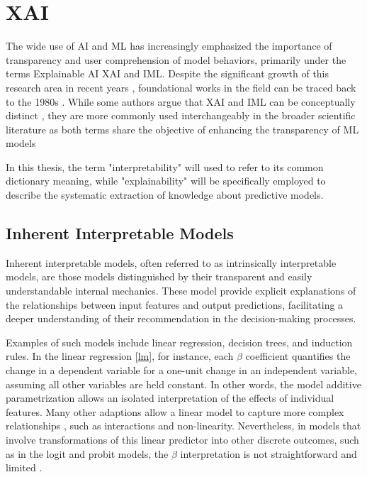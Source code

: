 \section{XAI}

The wide use of \gls{AI} and \gls{ML} has increasingly emphasized the importance of transparency and user comprehension of model behaviors, primarily under the terms Explainable AI \gls{XAI} and \gls{IML}. Despite the significant growth of this research area in recent years \cite{Arya2019OneTechniques}, foundational works in the field can be traced back to the 1980s \cite{Fagant1980COMPUTER-BASEDVM, Bareiss1988Protos:Apprentice}. While some authors argue that \gls{XAI} and \gls{IML} can be conceptually distinct \cite{Watson2022ConceptualLearning}, they are more commonly used interchangeably in the broader scientific literature as both terms share the objective of enhancing the transparency of \gls{ML} models \cite{Molnar2022Model-agnosticLearning}

In this thesis, the term "interpretability" will used to refer to its common dictionary meaning, while "explainability" will be specifically employed to describe the systematic extraction of knowledge about predictive models. 

\subsection{Inherent Interpretable Models}

Inherent interpretable models, often referred to as intrinsically interpretable models, are those models distinguished by their transparent and easily understandable internal mechanics. These model provide explicit explanations of the relationships between input features and output predictions, facilitating a deeper understanding of their recommendation in the decision-making processes. 

Examples of such models include linear regression, decision trees, and induction rules. In the linear regression \ref{lm}, for instance, each $\beta$ coefficient quantifies the change in a dependent variable for a one-unit change in an independent variable, assuming all other variables are held constant. In other words, the model additive parametrization allows an isolated interpretation of the effects of individual features. Many other adaptions allow a linear model to capture more complex relationships \cite{TrevorHastieRobertTibshirani2014AssessmentSelection}, such as interactions and non-linearity. Nevertheless, in models that involve transformations of this linear predictor into other discrete outcomes, such as in the logit and probit models, the $\beta$ interpretation is not straightforward and limited \cite{Mood2017LogisticHeterogeneity, long1997regression}. 

